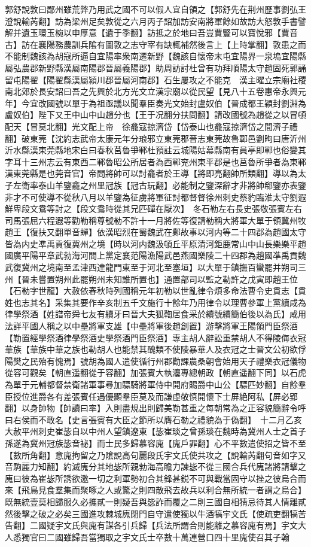 郭舒說敦曰鄙州雖荒弊乃用武之國不可以假人宜自領之【郭舒先在荆州歷事劉弘王澄說輸芮翻】訪為梁州足矣敦從之六月丙子詔加訪安南將軍餘如故訪大怒敦手書譬解并遺玉環玉椀以申厚意【遺于季翻】訪抵之於地曰吾豈賈豎可以寶悅邪【賈音古】訪在襄陽務農訓兵隂有圖敦之志守宰有缺輒補然後言上【上時掌翻】敦患之而不能制魏該為胡寇所逼自宜陽率衆南遷新野【魏該自懷帝末屯宜陽界一泉塢宜陽縣屬弘農郡新野縣漢屬南陽郡晉屬義陽郡】助周訪討杜曾有功拜順陽太守趙固死郭誦留屯陽翟【陽翟縣漢屬潁川郡晉屬河南郡】石生屢攻之不能克　漢主曜立宗廟社稷南北郊於長安詔曰吾之先興於北方光文立漢宗廟以從民望【見八十五卷惠帝永興元年】今宜改國號以單于為祖亟議以聞羣臣奏光文始封盧奴伯【晉成都王穎封劉淵為盧奴伯】陛下又王中山中山趙分也【王于况翻分扶問翻】請改國號為趙從之以冒頓配天【冒莫北翻】光文配上帝　徐龕寇掠濟岱【岱泰山也龕寇掠濟岱之間濟子禮翻】破東莞【沈約志武帝太康元年分琅邪立東莞郡晉志東莞故魯鄆邑劉昫曰唐沂州沂水縣漢東莞縣地宋白曰春秋莒魯爭鄆杜預註云城陽姑幕縣南有員亭即鄆也俗變其字耳十三州志云有東西二鄆魯昭公所居者為西鄆兖州東平郡是也莒魯所爭者為東鄆漢東莞縣是也莞音官】帝問將帥可以討龕者於王導【將即亮翻帥所類翻】導以為太子左衛率泰山羊鑒龕之州里冠族【冠古玩翻】必能制之鑒深辭才非將帥郗鑒亦表鑒非才不可使導不從秋八月以羊鑒為征虜將軍征討都督督徐州刺史蔡豹臨淮太守劉遐鮮卑段文鴦等討之【段文鴦時從其兄匹磾在厭次】　冬石勒左右長史張敬張賓左右司馬張屈六程遐等勸勒稱尊號勒不許十一月將佐等復請勒稱大將軍大單于領冀州牧趙王【復扶又翻單音蟬】依漢昭烈在蜀魏武在鄴故事以河内等二十四郡為趙國太守皆為内史凖禹貢復冀州之境【時以河内魏汲頓丘平原清河鉅鹿常山中山長樂樂平趙國廣平陽平章武勃海河間上黨定襄范陽漁陽武邑燕國樂陵二十四郡為趙國凖禹貢魏武復冀州之境南至孟津西達龍門東至于河北至塞垣】以大單于鎮撫百蠻罷并朔司三州【晉未嘗置朔州此罷朔州未知誰所置也】通置部司以監之勒許之戊寅即趙王位【石勒字世龍】大赦依春秋時列國稱元年初勒以世亂律令煩多命法曹令史貫志【貫姓也志其名】采集其要作辛亥制五千文施行十餘年乃用律令以理曹參軍上黨續咸為律學祭酒【姓譜帝舜七友有續牙曰晉大夫狐鞫居食采於續號續簡伯後以為氏】咸用法詳平國人稱之以中壘將軍支雄【中壘將軍後趙創置】游擊將軍王陽領門臣祭酒【勒置經學祭酒律學祭酒史學祭酒門臣祭酒】專主胡人辭訟重禁胡人不得陵侮衣冠華族【華族中華之族也勒胡人也能禁其醜類不使陵暴華人及衣冠之士晉文公初欲俘陽樊之民殆有愧焉】號胡為國人遣使循行州郡勸課農桑朝會始用天子禮樂衣冠儀物從容可觀矣【朝直遥翻從于容翻】加張賓大執灋專總朝政【朝直遥翻下同】以石虎為單于元輔都督禁衛諸軍事尋加驃騎將軍侍中開府賜爵中山公【驃匹妙翻】自餘羣臣授位進爵各有差張賓任遇優顯羣臣莫及而謙虛敬慎開懷下士屏絶阿私【屏必郢翻】以身帥物【帥讀曰率】入則盡規出則歸美勒甚重之每朝常為之正容貌簡辭令呼曰右侯而不敢名【史言張賓有大臣之節所以膺石勒之禮貌為于偽翻】　十二月乙亥大赦平州刺史崔毖自以中州人望鎮遼東【毖崔琰之曾孫琰在魏時為冀州人士之首子孫遂為冀州冠族毖音袐】而士民多歸慕容廆【廆戶罪翻】心不平數遣使招之皆不至【數所角翻】意廆拘留之乃隂說高句麗段氏宇文氏使共攻之【說輸芮翻句音如字又音駒麗力知翻】約滅廆分其地毖所親勃海高瞻力諫毖不從三國合兵代廆諸將請擊之廆曰彼為崔毖所誘欲邀一切之利軍勢初合其鋒甚鋭不可與戰當固守以挫之彼烏合而來【飛鳥見食羣集而聚啄之人或驚之則四散飛去故兵以利合無所統一者謂之烏合】既無統壹莫相歸服久必攜貳一則疑吾與毖詐而覆之二則三國自相猜忌待其人情離貳然後擊之破之必矣三國進攻棘城廆閉門自守遣使獨以牛酒犒宇文氏【使疏吏翻犒苦告翻】二國疑宇文氏與廆有謀各引兵歸【兵法所謂合則能離之慕容廆有焉】宇文大人悉獨官曰二國雖歸吾當獨取之宇文氏士卒數十萬連營口四十里廆使召其子翰